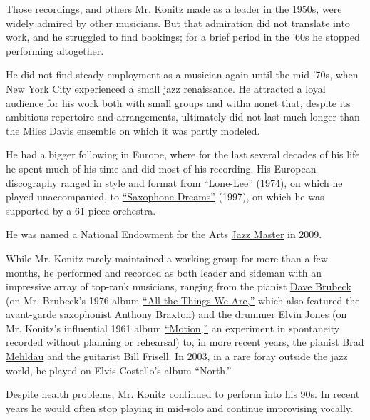 Those recordings, and others Mr. Konitz made as a leader in the 1950s,
were widely admired by other musicians. But that admiration did not
translate into work, and he struggled to find bookings; for a brief
period in the '60s he stopped performing altogether.

He did not find steady employment as a musician again until the
mid-'70s, when New York City experienced a small jazz renaissance. He
attracted a loyal audience for his work both with small groups and
with\href{https://www.youtube.com/watch?v=ge6RoRO-3sU}{a nonet} that,
despite its ambitious repertoire and arrangements, ultimately did not
last much longer than the Miles Davis ensemble on which it was partly
modeled.

He had a bigger following in Europe, where for the last several decades
of his life he spent much of his time and did most of his recording. His
European discography ranged in style and format from ``Lone-Lee''
(1974), on which he played unaccompanied, to
\href{https://www.youtube.com/watch?v=eYVqhj7xnIg}{``Saxophone Dreams''}
(1997), on which he was supported by a 61-piece orchestra.

He was named a National Endowment for the Arts
\href{https://www.arts.gov/honors/jazz/lee-konitz}{Jazz Master} in 2009.

While Mr. Konitz rarely maintained a working group for more than a few
months, he performed and recorded as both leader and sideman with an
impressive array of top-rank musicians, ranging from the pianist
\href{https://www.nytimes.com/2012/12/06/arts/music/dave-brubeck-jazz-musician-dies-at-91.html}{Dave
Brubeck} (on Mr. Brubeck's 1976 album
\href{https://www.youtube.com/watch?v=2kwAoh8jl0U}{``All the Things We
Are,''} which also featured the avant-garde saxophonist
\href{https://www.nytimes.com/2019/01/11/arts/anthony-braxton-composer.html}{Anthony
Braxton}) and the drummer
\href{https://www.nytimes.com/2004/05/19/arts/elvin-jones-jazz-drummer-with-coltrane-dies-at-76.html}{Elvin
Jones} (on Mr. Konitz's influential 1961 album
\href{https://www.youtube.com/watch?v=IpNhX-UvIxM}{``Motion,''} an
experiment in spontaneity recorded without planning or rehearsal) to, in
more recent years, the pianist
\href{https://www.youtube.com/watch?v=jAKwaZOWX8c}{Brad Mehldau} and the
guitarist Bill Frisell. In 2003, in a rare foray outside the jazz world,
he played on Elvis Costello's album ``North.''

Despite health problems, Mr. Konitz continued to perform into his 90s.
In recent years he would often stop playing in mid-solo and continue
improvising vocally.

